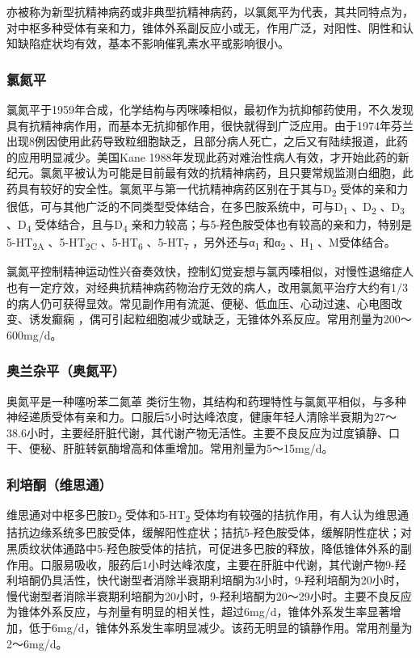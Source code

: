 亦被称为新型抗精神病药或非典型抗精神病药，以氯氮平为代表，其共同特点为，对中枢多种受体有亲和力，锥体外系副反应小或无，作用广泛，对阳性、阴性和认知缺陷症状均有效，基本不影响催乳素水平或影响很小。

\subsubsection{氯氮平}

氯氮平于1959年合成，化学结构与丙咪嗪相似，最初作为抗抑郁药使用，不久发现具有抗精神病作用，而基本无抗抑郁作用，很快就得到广泛应用。由于1974年芬兰出现8例因使用此药导致粒细胞缺乏，且部分病人死亡，之后又有陆续报道，此药的应用明显减少。美国Kane
1988年发现此药对难治性病人有效，才开始此药的新纪元。氯氮平被认为可能是目前最有效的抗精神病药，且只要常规监测白细胞，此药具有较好的安全性。氯氮平与第一代抗精神病药区别在于其与D\textsubscript{2}
受体的亲和力很低，可与其他广泛的不同类型受体结合，在多巴胺系统中，可与D\textsubscript{1}
、D\textsubscript{2} 、D\textsubscript{3} 、D\textsubscript{4}
受体结合，且与D\textsubscript{4}
亲和力较高；与5-羟色胺受体也有较高的亲和力，特别是5-HT\textsubscript{2A}
、5-HT\textsubscript{2C} 、5-HT\textsubscript{6} 、5-HT\textsubscript{7}
，另外还与α\textsubscript{1} 和α\textsubscript{2} 、H\textsubscript{1}
、M受体结合。

氯氮平控制精神运动性兴奋奏效快，控制幻觉妄想与氯丙嗪相似，对慢性退缩症人也有一定疗效，对经典抗精神病药物治疗无效的病人，改用氯氮平治疗大约有1/3的病人仍可获得显效。常见副作用有流涎、便秘、低血压、心动过速、心电图改变、诱发癫痫
，偶可引起粒细胞减少或缺乏，无锥体外系反应。常用剂量为200～600mg/d。

\subsubsection{奥兰杂平（奥氮平）}

奥氮平是一种噻吩苯二氮䓬
类衍生物，其结构和药理特性与氯氮平相似，与多种神经递质受体有亲和力。口服后5小时达峰浓度，健康年轻人清除半衰期为27～38.6小时，主要经肝脏代谢，其代谢产物无活性。主要不良反应为过度镇静、口干、便秘、肝脏转氨酶增高和体重增加。常用剂量为5～15mg/d。

\subsubsection{利培酮（维思通）}

维思通对中枢多巴胺D\textsubscript{2} 受体和5-HT\textsubscript{2}
受体均有较强的拮抗作用，有人认为维思通拮抗边缘系统多巴胺受体，缓解阳性症状；拮抗5-羟色胺受体，缓解阴性症状；对黑质纹状体通路中5-羟色胺受体的拮抗，可促进多巴胺的释放，降低锥体外系的副作用。口服易吸收，服药后1小时达峰浓度，主要在肝脏中代谢，其代谢产物9-羟利培酮仍具活性，快代谢型者消除半衰期利培酮为3小时，9-羟利培酮为20小时，慢代谢型者消除半衰期利培酮为20小时，9-羟利培酮为20～29小时。主要不良反应为锥体外系反应，与剂量有明显的相关性，超过6mg/d，锥体外系发生率显著增加，低于6mg/d，锥体外系发生率明显减少。该药无明显的镇静作用。常用剂量为2～6mg/d。

